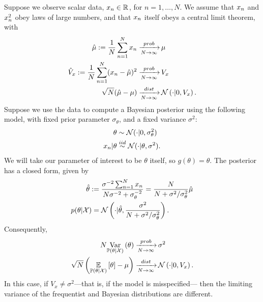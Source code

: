 Suppose we observe scalar data, $x_n \in \mathbb{R}^{}$, for $n=1,\ldots,N$.
We assume that $x_n$ and $x_n^2$ obey laws of large numbers, and that
$x_n$ itself obeys a central limit theorem, with
%
\begin{align*}
%
\hat{\mu} := \meann x_n \plim& \mu\\
\hat{V}_{x} := \meann (x_n - \hat{\mu})^2 \plim& V_x\\
\sqrt{N}(\hat{\mu} - \mu) \dlim& \normdist\left(\cdot \vert 0, V_x \right).
%
\end{align*}
%
Suppose we use the data to compute a Bayesian posterior using
the following model, with fixed prior parameter $\sigma_\theta$, and
a fixed variance $\sigma^2$:
%
\begin{align*}
%
\theta &\sim \normdist(\cdot | 0, \sigma_\theta^2)\\
\x_n | \theta & \iid \normdist(\cdot | \theta, \sigma^2).
%
\end{align*}
%
We will take our parameter of interest to be $\theta$ itself, so $g(\theta) =
\theta$.  The posterior has a closed form, given by
%
\begin{align*}
%
\hat\theta :={}&
    \frac{\sigma^{-2} \sumn \x_n}{N \sigma^{-2} + \sigma_\theta^{-2}} =
    \frac{N}{N + \sigma^2 / \sigma_\theta^2} \hat{\mu}\\
p(\theta \vert \xvec) ={}& \normdist\left(
        \cdot | \hat\theta, \frac{\sigma^2}{N + \sigma^2 / \sigma_\theta^2}
    \right).
%
\end{align*}
%
Consequently,
%
\begin{align*}
%
N \var{\post}{\theta} \plim& \sigma^2\\
\sqrt{N}\left(\expect{\post}{\theta} - \mu \right) \dlim&
    \mathcal{N}\left(\cdot | 0, V_x \right).
%
\end{align*}
%
In this case, if $V_x \ne \sigma^2$---that is, if the model is misspecified---
then the limiting variance of the frequentist and Bayesian distributions
are different.

